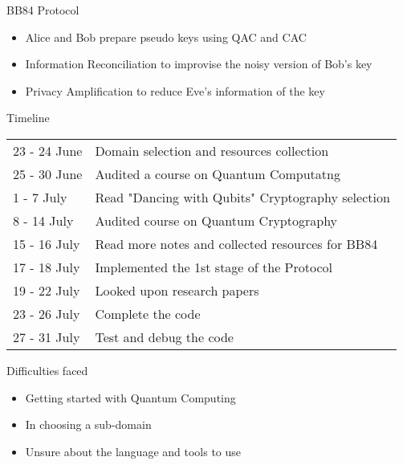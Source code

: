 \documentclass[10 pt]{beamer}
\begin{document}
\begin{frame}{BB84 Protocol}
    \begin{itemize}[<+->]
        \item Alice and Bob prepare pseudo keys using QAC and CAC
        \item Information Reconciliation to improvise the noisy version of Bob's key
        \item Privacy Amplification to reduce Eve's information of the key
    \end{itemize}
\end{frame}


\begin{frame}{Timeline}
    \begin{tabular}{ll}
            23 - 24 June & Domain selection and resources collection\\
            25 - 30 June & Audited a course on Quantum Computatng\\
            1 - 7 July & Read "Dancing with Qubits" Cryptography selection\\
            8 - 14 July & Audited course on Quantum Cryptography\\
            15 - 16 July & Read more notes and collected resources for BB84\\
            17 - 18 July & Implemented the 1st stage of the Protocol\\
            19 - 22 July & Looked upon research papers\\
            23 - 26 July & Complete the code\\
            27 - 31 July & Test and debug the code\\
     \end{tabular}
\end{frame}

\begin{frame}{Difficulties faced}
	\begin{itemize}
		\item Getting started with Quantum Computing
        \item In choosing a sub-domain
        \item Unsure about the language and tools to use
	\end{itemize}
\end{frame}
		
\end{document}
